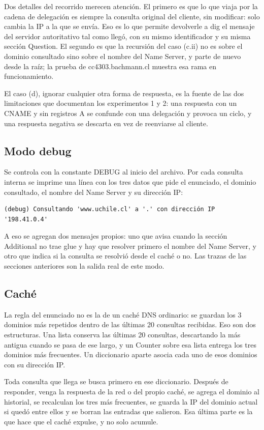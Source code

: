 \documentclass[
	spanish, %
	letterpaper, oneside
]{article}
\begin{document}
Dos detalles del recorrido merecen atención. El primero es que lo que viaja por la cadena de delegación es siempre la consulta original del cliente, sin modificar: solo cambia la IP a la que se envía. Eso es lo que permite devolverle a dig el mensaje del servidor autoritativo tal como llegó, con su mismo identificador y su misma sección Question. El segundo es que la recursión del caso (c.ii) no es sobre el dominio consultado sino sobre el nombre del Name Server, y parte de nuevo desde la raíz; la prueba de cc4303.bachmann.cl muestra esa rama en funcionamiento.

El caso (d), ignorar cualquier otra forma de respuesta, es la fuente de las dos limitaciones que documentan los experimentos 1 y 2: una respuesta con un CNAME y sin registros A se confunde con una delegación y provoca un ciclo, y una respuesta negativa se descarta en vez de reenviarse al cliente.

\subsection{Modo debug}
Se controla con la constante DEBUG al inicio del archivo. Por cada consulta interna se imprime una línea con los tres datos que pide el enunciado, el dominio consultado, el nombre del Name Server y su dirección IP:

\begin{verbatim}
(debug) Consultando 'www.uchile.cl' a '.' con dirección IP '198.41.0.4'
\end{verbatim}

A eso se agregan dos mensajes propios: uno que avisa cuando la sección Additional no trae glue y hay que resolver primero el nombre del Name Server, y otro que indica si la consulta se resolvió desde el caché o no. Las trazas de las secciones anteriores son la salida real de este modo.

\subsection{Caché}
La regla del enunciado no es la de un caché DNS ordinario: se guardan los 3 dominios más repetidos dentro de las últimas 20 consultas recibidas. Eso son dos estructuras. Una lista conserva las últimas 20 consultas, descartando la más antigua cuando se pasa de ese largo, y un Counter sobre esa lista entrega los tres dominios más frecuentes. Un diccionario aparte asocia cada uno de esos dominios con su dirección IP.

Toda consulta que llega se busca primero en ese diccionario. Después de responder, venga la respuesta de la red o del propio caché, se agrega el dominio al historial, se recalculan los tres más frecuentes, se guarda la IP del dominio actual si quedó entre ellos y se borran las entradas que salieron. Esa última parte es la que hace que el caché expulse, y no solo acumule.
\end{document}
